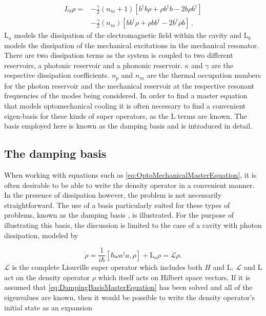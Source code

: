 \documentclass[12pt]{article}
\begin{document}
\begin{align}
L_b \rho =& - \frac{\gamma}{2}(n_m + 1)[b^\dagger b\rho + \rho b^\dagger b -2b\rho b^\dagger]  \\
 &- \frac{\gamma}{2}(n_m)[ bb^\dagger\rho + \rho  bb^\dagger -2b^\dagger\rho b]\, .\nonumber
\end{align} $\mathrm{L}_a$ models the dissipation of the electromagnetic field within the cavity and $\mathrm{L}_b$ models the dissipation of the mechanical excitations in the mechanical resonator. There are two dissipation terms as the system is coupled to two different reservoirs, a photonic reservoir and a phononic reservoir. $\kappa$ and $\gamma$ are the respective dissipation coefficients. $n_p$ and $n_m$ are the thermal occupation numbers for the photon reservoir and the mechanical reservoir at the respective resonant frequencies of the modes being considered. In order to find a master equation that models optomechanical cooling it is often necessary to find a convenient eigen-basis for these kinds of super operators, as the $\mathrm{L}$ terms are known. The basis employed here is known as the damping basis and is introduced in detail. 

\subsection{The damping basis}

When working with equations such as \eqref{eq:OptoMechanicalMasterEquation}, it is often desirable to be able to write the density operator in a convenient manner.  In the presence of dissipation however, the problem is not necessarily straightforward. The use of a basis particularly suited for these types of problems, known as the damping basis \cite{BriegelDampingBasis1993}, is illustrated. For the purpose of illustrating this basis, the discussion is limited to the case of a cavity with photon dissipation, modeled by

\begin{equation}\label{eq:DampingBasisMasterEquation}
    \dot{\rho} = \frac{1}{i\hbar}[\hbar \omega a^\dagger a,\rho] +\mathrm{L}_a\rho = \mathcal{L}\rho.
\end{equation} $\mathcal{L}$ is the complete Liouville super operator which includes both $H$ and $\mathrm{L}$. $\mathcal{L}$ and $\mathrm{L}$ act on the density operator $\rho$ which itself acts on Hilbert space vectors. If it is assumed that \eqref{eq:DampingBasisMasterEquation} has been solved and all of the eigenvalues are known, then it would be possible to write the density operator's initial state as an expansion
\end{document}
